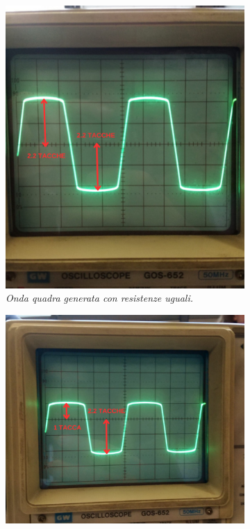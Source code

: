   \begin{figure}[h]
    \centering
      \begin{subfigure}{0.3\textwidth}
        \centering
        \includegraphics[width=\textwidth]{../assets/Resistenze_Uguali.png}
        \caption{\emph{Onda quadra generata con resistenze uguali.}}
        \label{fig : resistenze uguali}
      \end{subfigure}
      \begin{subfigure}{0.3\textwidth}
        \centering
        \includegraphics[width=\textwidth]{../assets/Resistenze_Diverse.png}

\end{subfigure}
\end{figure}
